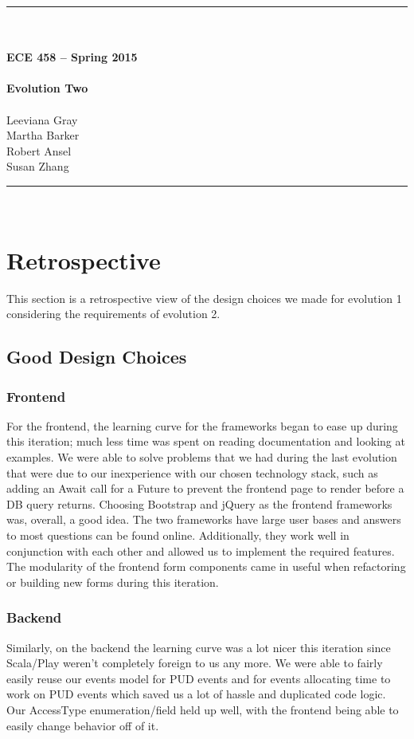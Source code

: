 \documentclass{article}
\begin{document}
\begin{center}
\rule{6.5in}{0.5mm}\\~\\
{\bf \large ECE 458 -- Spring 2015}\\~\\  
{\huge \bf Evolution Two}\\~\\
Leeviana Gray\\
Martha Barker\\
Robert Ansel\\
Susan Zhang\\
\rule{6.5in}{0.5mm}\\
\end{center}
\tableofcontents
\pagebreak

\section{Retrospective}
This section is a retrospective view of the design choices we made for evolution 1 considering the requirements of evolution 2.

\subsection{Good Design Choices}
\subsubsection{Frontend}
For the frontend, the learning curve for the frameworks began to ease up during this iteration; much less time was spent on reading documentation and looking at examples. We were able to solve problems that we had during the last evolution that were due to our inexperience with our chosen technology stack, such as adding an Await call for a Future to prevent the frontend page to render before a DB query returns. Choosing Bootstrap and jQuery as the frontend frameworks was, overall, a good idea. The two frameworks have large user bases and answers to most questions can be found online. Additionally, they work well in conjunction with each other and allowed us to implement the required features. The modularity of the frontend form components came in useful when refactoring or building new forms during this iteration.

\subsubsection{Backend}
Similarly, on the backend the learning curve was a lot nicer this iteration since Scala/Play weren't completely foreign to us any more. We were able to fairly easily reuse our events model for PUD events and for events allocating time to work on PUD events which saved us a lot of hassle and duplicated code logic. Our AccessType enumeration/field held up well, with the frontend being able to easily change behavior off of it. 
\end{document}
